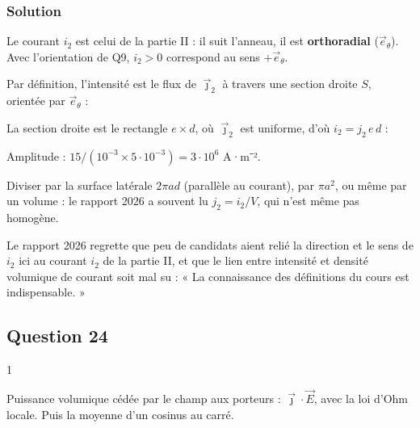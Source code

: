\documentclass[11pt,a4paper]{article}
\newcommand{\equationajustee}[1]{%
  \sbox{\boiteequation}{$\displaystyle #1$}%
  \ifdim\wd\boiteequation>\linewidth
    \[\resizebox{\linewidth}{!}{\usebox{\boiteequation}}\]%
  \else
    \[#1\]%
  \fi}
\begin{document}
\hypertarget{solution-22}{%
\subsubsection{Solution}\label{solution-22}}

Le courant \(i_2\) est celui de la partie II : il suit l'anneau, il est \textbf{orthoradial} (\(\vec e_\theta\)). Avec l'orientation de Q9, \(i_2>0\) correspond au sens \(+\vec e_\theta\).

Par définition, l'intensité est le flux de \(\vec\jmath_2\) à travers une section droite \(S\), orientée par \(\vec e_\theta\) :

\equationajustee{i_2=\iint_S\vec\jmath_2\cdot\mathrm d\vec S}

La section droite est le rectangle \(e\times d\), où \(\vec\jmath_2\) est uniforme, d'où \(i_2=j_2\,e\,d\) :

\equationajustee{\boxed{\vec\jmath_2(t)=\frac{I_2\cos(\omega t)}{e\,d}\,\vec e_\theta}}

Amplitude : \(15/(10^{-3}\times5\cdot10^{-3})=3\cdot10^6\) A·m⁻².

\begin{piege}

Diviser par la surface latérale \(2\pi ad\) (parallèle au courant), par \(\pi a^2\), ou même par un volume : le rapport 2026 a souvent lu \(j_2=i_2/V\), qui n'est même pas homogène.

\end{piege}

\begin{jury}

Le rapport 2026 regrette que peu de candidats aient relié la direction et le sens de \(i_2\) ici au courant \(i_2\) de la partie II, et que le lien entre intensité et densité volumique de courant soit mal su : « La connaissance des définitions du cours est indispensable. »

\end{jury}

\hypertarget{question-24}{%
\subsection{Question 24}\label{question-24}}

\begin{indication}{1}

Puissance volumique cédée par le champ aux porteurs : \(\vec\jmath\cdot\vec E\), avec la loi d'Ohm locale. Puis la moyenne d'un cosinus au carré.

\end{indication}
\end{document}
